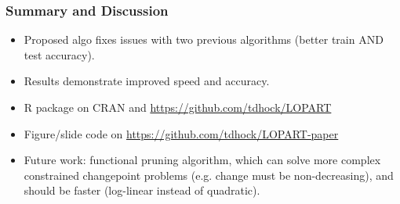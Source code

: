 \documentclass{beamer}
\begin{document}
\begin{frame}
  \frametitle{Summary and Discussion}
  \begin{itemize}
  \item Proposed algo fixes issues with two previous algorithms (better
  train AND test accuracy).
\item Results demonstrate improved speed and accuracy.
\item R package on CRAN and \url{https://github.com/tdhock/LOPART}
  \item Figure/slide code on \url{https://github.com/tdhock/LOPART-paper}
\item Future work: functional pruning algorithm, which can solve more
  complex constrained changepoint problems (e.g. change must be
  non-decreasing), and should be faster (log-linear instead of
  quadratic).
  \end{itemize}
\end{frame}
\end{document}
